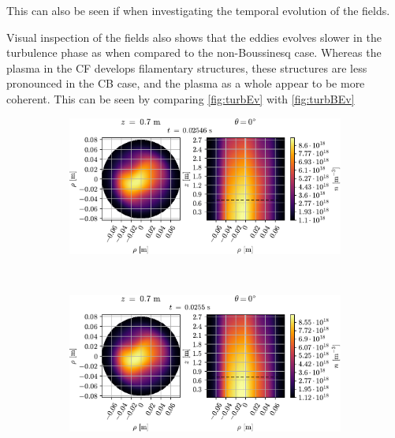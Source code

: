 This can also be seen if when investigating the temporal evolution of the fields.

Visual inspection of the fields also shows that the eddies evolves slower in the turbulence phase as when compared to the non-Boussinesq case.
Whereas the plasma in the CF develops filamentary structures, these structures are less pronounced in the CB case, and the plasma as a whole appear to be more coherent.
This can be seen by comparing \cref{fig:turbEv} with \cref{fig:turbBEv}
%
{
\begin{figure}[htbp]
    \centering
    \begin{subfigure}[h]{1.00\textwidth}
        \centering
        \includegraphics[width=1.0\textwidth]{fig/results/compareBouss/evolution/n-perpPar-2D-0}
    \end{subfigure}%
    \\
    \begin{subfigure}[h]{1.00\textwidth}
        \centering
        \includegraphics[width=1.0\textwidth]{fig/results/compareBouss/evolution/n-perpPar-2D-1}
    \end{subfigure}
    \\

\end{figure}}
